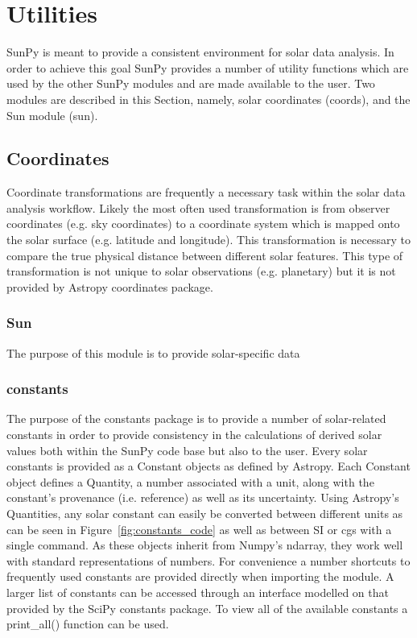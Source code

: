 \section{Utilities}
SunPy is meant to provide a consistent environment for solar data analysis. In order to
achieve this goal SunPy provides a number of utility functions which are used by the other
SunPy modules and are made available to the user. Two modules are described in this Section, 
namely, solar coordinates (coords), and the Sun module (sun). 
	
\subsection{Coordinates}
Coordinate transformations are frequently a necessary task within the solar data analysis
workflow. Likely the most often used transformation is from observer coordinates (e.g. 
sky coordinates) to a coordinate system which is mapped onto the solar surface (e.g.
latitude and longitude). This transformation is necessary to compare the true physical
distance between different solar features. This type of transformation is not unique
to solar observations (e.g. planetary) but it is not provided by Astropy coordinates 
package. 

\subsubsection{Sun}
The purpose of this module is to provide solar-specific data

\subsubsection{constants}
The purpose of the constants package is to provide a number of solar-related constants 
in order to provide consistency in the calculations of derived solar values both within the
SunPy code base but also to the user. Every solar constants is provided as a Constant objects as defined by Astropy. 
Each Constant object defines a Quantity, a number associated with a unit, along with the constant's provenance
(i.e. reference) as well as its uncertainty. Using Astropy's Quantities, any solar constant
can easily be converted between different units as can be seen in Figure~\ref{fig:constants_code} as well
as between SI or cgs with a single command.  As these objects inherit from Numpy's ndarray,
they work well with standard representations of numbers.
For convenience a number shortcuts to frequently used constants are provided directly when importing
the module. A larger list of constants can be accessed through an interface modelled 
on that provided by the SciPy constants package. To view all of the available constants
a print_all() function can be used.   
	